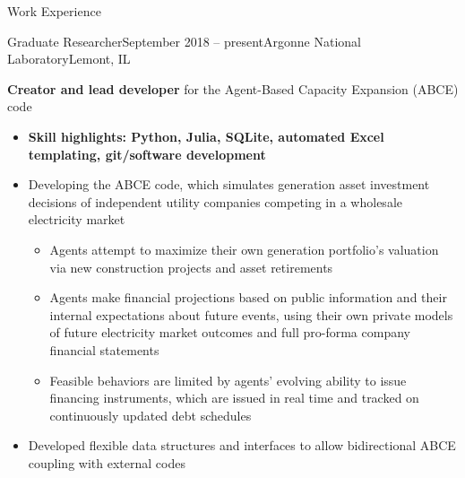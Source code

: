 \documentclass{resume} %
\begin{document}

\begin{rSection}{Work Experience}

\begin{rSubsection}{Graduate Researcher}{September 2018 -- present}{Argonne National Laboratory}{Lemont, IL}
  \item \textbf{Creator and lead developer} for the Agent-Based Capacity Expansion (ABCE) code
    \begin{itemize}
      \setlength{\itemsep}{-3pt}
      \item \textbf{Skill highlights: Python, Julia, SQLite, automated Excel templating, git/software development}
      \item Developing the ABCE code, which simulates generation asset investment decisions of independent utility companies competing in a wholesale electricity market
        \begin{itemize}
          \item Agents attempt to maximize their own generation portfolio's valuation via new construction projects and asset retirements
          \item Agents make financial projections based on public information and their internal expectations about future events, using their own private models of future electricity market outcomes and full pro-forma company financial statements
          \item Feasible behaviors are limited by agents' evolving ability to issue financing instruments, which are issued in real time and tracked on continuously updated debt schedules
        \end{itemize}
      \item Developed flexible data structures and interfaces to allow bidirectional ABCE coupling with external codes
    \end{itemize}


\end{rSubsection}
\end{rSection}
\end{document}
